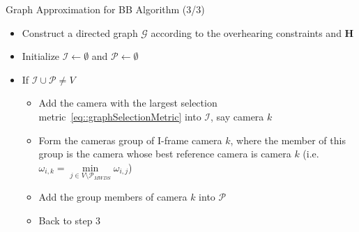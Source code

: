 \begin{frame}{Graph Approximation for BB Algorithm (3/3)}
\begin{itemize}
	\item[1.] Construct a directed graph $\mathcal{G}$ according to the overhearing constraints and $\mathbf{H}$
	\item[2.] Initialize $\mathcal{I} \gets \emptyset$ and $\mathcal{P} \gets \emptyset$
	\item[3.] If $\mathcal{I} \cup \mathcal{P} \neq V$
	\begin{itemize}
		\item[3-1.] Add the camera with the largest selection metric~\eqref{eq::graphSelectionMetric} into $\mathcal{I}$, say camera $k$
		\item[3-2.] Form the cameras group of I-frame camera $k$, where the member of this group is the camera whose best reference camera is camera $k$ (i.e. $\omega_{i,k} = \underset{j \in V \setminus \mathcal{P}_{MWDS}}{\min} \omega_{i,j}$)
		\item[3-3.] Add the group members of camera $k$ into $\mathcal{P}$
		\item[3-4.] Back to step 3
	\end{itemize}
\end{itemize}
\end{frame}